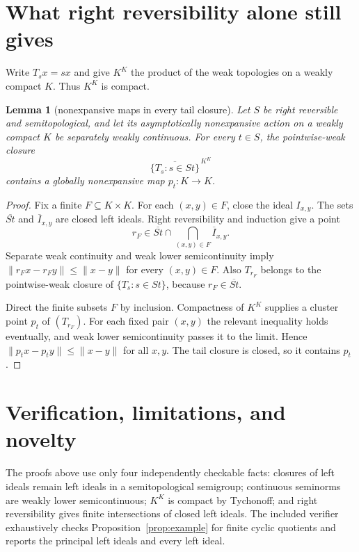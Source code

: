 \documentclass[11pt]{article}
\newtheorem{lemma}[theorem]{Lemma}
\theoremstyle{definition}
\theoremstyle{remark}
\newcommand{\cl}{\overline}
\begin{document}
\section{What right reversibility alone still gives}

Write $T_sx=sx$ and give $K^K$ the product of the weak topologies on a weakly
compact $K$.  Thus $K^K$ is compact.

\begin{lemma}[nonexpansive maps in every tail closure]\label{lem:compact}
Let $S$ be right reversible and semitopological, and let its asymptotically
nonexpansive action on a weakly compact $K$ be separately weakly continuous.
For every $t\in S$, the pointwise-weak closure
\[
 \cl{\{T_s:s\in St\}}^{\,K^K}
\]
contains a globally nonexpansive map $p_t:K\to K$.
\end{lemma}

\begin{proof}
Fix a finite $F\subseteq K\times K$.  For each $(x,y)\in F$, close the ideal
$I_{x,y}$.  The sets $\cl{St}$ and $\cl I_{x,y}$ are closed left ideals.
Right reversibility and induction give a point
\[
 r_F\in\cl{St}\cap\bigcap_{(x,y)\in F}\cl I_{x,y}.
\]
Separate weak continuity and weak lower semicontinuity imply
$\|r_Fx-r_Fy\|\leq\|x-y\|$ for every $(x,y)\in F$.  Also
$T_{r_F}$ belongs to the pointwise-weak closure of $\{T_s:s\in St\}$,
because $r_F\in\cl{St}$.

Direct the finite subsets $F$ by inclusion.  Compactness of $K^K$ supplies a
cluster point $p_t$ of $(T_{r_F})$.  For each fixed pair $(x,y)$ the relevant
inequality holds eventually, and weak lower semicontinuity passes it to the
limit.  Hence $\|p_tx-p_ty\|\leq\|x-y\|$ for all $x,y$.  The tail closure is
closed, so it contains $p_t$.
\end{proof}

\section{Verification, limitations, and novelty}

The proofs above use only four independently checkable facts: closures of
left ideals remain left ideals in a semitopological semigroup; continuous
seminorms are weakly lower semicontinuous; $K^K$ is compact by Tychonoff; and
right reversibility gives finite intersections of closed left ideals.  The
included verifier exhaustively checks Proposition~\ref{prop:example} for
finite cyclic quotients and reports the principal left ideals and every left
ideal.
\end{document}
